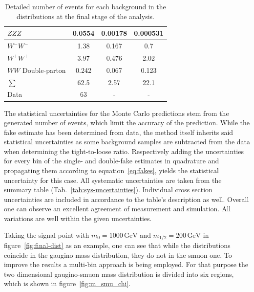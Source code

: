 \begin{table}[!htb]
\begin{tabular}{|l|c|c|c|}
    $ZZZ$                           & 0.0554                               & 0.00178 & 0.000531                  \\ \hline
    $W^- W^-$                       & 1.38                                 & 0.167   & 0.7                       \\
    $W^+ W^+$                       & 3.97                                 & 0.476   & 2.02                      \\
    $WW$ Double-parton              & 0.242                                & 0.067   & 0.123                     \\ \hline
    $\sum$                          & 62.5                                 & 2.57    & 22.1                      \\ \hline
    Data                            & 63                                   & -       & -                         \\ \hline
  \end{tabular}
  \caption{Detailed number of events for each background in the distributions at the final stage of the analysis.}
  \label{tab:nev-msmuon}
\end{table}

The statistical uncertainties for the Monte Carlo predictions stem from the generated number of events, which limit the accuracy of the prediction. While the fake estimate has been determined from data, the method itself inherits said statistical uncertainties as some background samples are subtracted from the data when determining the tight-to-loose ratio. Respectively adding the uncertainties for every bin of the single- and double-fake estimates in quadrature and propagating them according to equation~\eqref{eq:fakes}, yields the statistical uncertainty for this case. All systematic uncertainties are taken from the summary table (Tab.~\ref{tab:sys-uncertainties}). Individual cross section uncertainties are included in accordance to the table's description as well. Overall one can observe an excellent agreement of measurement and simulation. All variations are well within the given uncertainties.

Taking the signal point with $m_0 = 1000\,\text{GeV}$ and $m_{1/2} = 200\,\text{GeV}$ in figure~\ref{fig:final-dist} as an example, one can see that while the distributions coincide in the gaugino mass distribution, they do not in the smuon one. To improve the results a multi-bin approach is being employed. For that purpose the two dimensional gaugino-smuon mass distribution is divided into six regions, which is shown in figure~\ref{fig:m_smu_chi}.

